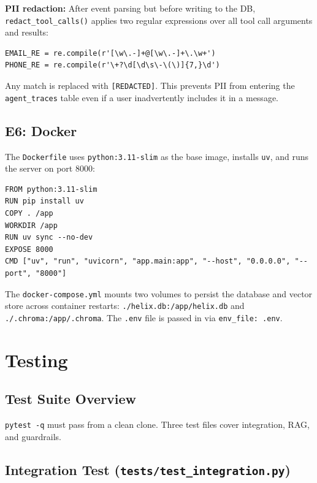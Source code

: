 \documentclass[12pt,a4paper]{article}
\begin{document}
\textbf{PII redaction:} After event parsing but before writing to the DB, \texttt{redact\_tool\_calls()} applies two regular expressions over all tool call arguments and results:

\begin{lstlisting}[style=python, numbers=none]
EMAIL_RE = re.compile(r'[\w\.-]+@[\w\.-]+\.\w+')
PHONE_RE = re.compile(r'\+?\d[\d\s\-\(\)]{7,}\d')
\end{lstlisting}

Any match is replaced with \texttt{[REDACTED]}. This prevents PII from entering the \texttt{agent\_traces} table even if a user inadvertently includes it in a message.

\subsection{E6: Docker}

The \texttt{Dockerfile} uses \texttt{python:3.11-slim} as the base image, installs \texttt{uv}, and runs the server on port 8000:

\begin{lstlisting}[numbers=none]
FROM python:3.11-slim
RUN pip install uv
COPY . /app
WORKDIR /app
RUN uv sync --no-dev
EXPOSE 8000
CMD ["uv", "run", "uvicorn", "app.main:app", "--host", "0.0.0.0", "--port", "8000"]
\end{lstlisting}

The \texttt{docker-compose.yml} mounts two volumes to persist the database and vector store across container restarts: \texttt{./helix.db:/app/helix.db} and \texttt{./.chroma:/app/.chroma}. The \texttt{.env} file is passed in via \texttt{env\_file: .env}.

\section{Testing}

\subsection{Test Suite Overview}

\texttt{pytest -q} must pass from a clean clone. Three test files cover integration, RAG, and guardrails.

\subsection{Integration Test (\texttt{tests/test\_integration.py})}
\end{document}
